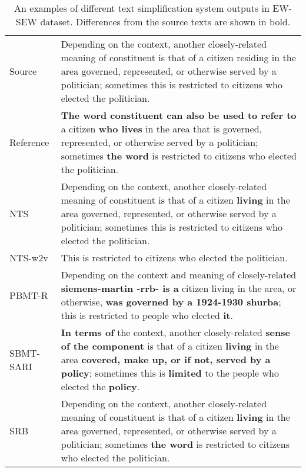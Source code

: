 \documentclass{clv3}
\begin{document}
\begin{CJK*}{UTF8}{gbsn}
\begin{table}[tb]
	\centering
	\caption{An examples of different text simplification system outputs in EW-SEW dataset. Differences from the source texts are shown in bold.
	}\label{tab7}
	\begin{tabular}{| l  p{10.5cm}@{~} |}
		\hline
		Source & Depending on the context, another closely-related meaning of constituent is that of a citizen residing in the area governed, represented, or otherwise served by a politician; sometimes this is restricted to citizens who elected the politician. \\ 
		Reference & \textbf{The word constituent can also be used to refer to} a citizen \textbf{who lives} in the area that is governed, represented, or otherwise served by a politician; sometimes \textbf{the word} is restricted to citizens who elected the politician. \\
		NTS & Depending on the context, another closely-related meaning of constituent is that of a citizen \textbf{living} in the area governed, represented, or otherwise served by a politician; sometimes this is restricted to citizens who elected the politician. \\
		NTS-w2v & This is restricted to citizens who elected the politician. \\
		PBMT-R & Depending on the context and meaning of closely-related \textbf{siemens-martin -rrb- is a} citizen living in the area, or otherwise, \textbf{was governed by a 1924-1930 shurba}; this is restricted to people who elected \textbf{it}. \\
		SBMT-SARI & \textbf{In terms of} the context, another closely-related \textbf{sense of the component} is that of a citizen \textbf{living} in the area \textbf{covered, make up, or if not, served by a policy}; sometimes this is \textbf{limited} to the people who elected the \textbf{policy}.
		\\
		SRB & Depending on the context, another closely-related meaning of constituent is that of a citizen \textbf{living} in the area governed, represented, or otherwise served by a politician; sometimes \textbf{the word} is restricted to citizens who elected the politician. \\
		\hline
	\end{tabular}
	\vspace{-0.1in}
\end{table}



\end{CJK*}
\end{document}
